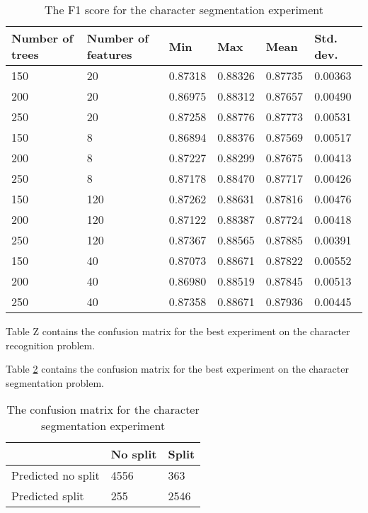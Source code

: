 \begin{table}[h]
\caption{The F1 score for the character segmentation experiment}
\label{table:seg_values}
\begin{tabular}{llllll}
\hline
Number of trees & Number of features & Min     & Max     & Mean    & Std. dev. \\ \hline
150 & 20 & 0.87318 & 0.88326 & 0.87735 & 0.00363 \\ 
200 & 20 & 0.86975 & 0.88312 & 0.87657 & 0.00490 \\ 
250 & 20 & 0.87258 & 0.88776 & 0.87773 & 0.00531 \\ 
150 & 8 & 0.86894 & 0.88376 & 0.87569 & 0.00517 \\ 
200 & 8 & 0.87227 & 0.88299 & 0.87675 & 0.00413 \\ 
250 & 8 & 0.87178 & 0.88470 & 0.87717 & 0.00426 \\ 
150 & 120 & 0.87262 & 0.88631 & 0.87816 & 0.00476 \\ 
200 & 120 & 0.87122 & 0.88387 & 0.87724 & 0.00418 \\ 
250 & 120 & 0.87367 & 0.88565 & 0.87885 & 0.00391 \\ 
150 & 40 & 0.87073 & 0.88671 & 0.87822 & 0.00552 \\ 
200 & 40 & 0.86980 & 0.88519 & 0.87845 & 0.00513 \\ 
250 & 40 & 0.87358 & 0.88671 & 0.87936 & 0.00445 \\  \hline
\end{tabular}
\end{table}

Table Z contains the confusion matrix for the best experiment on the character recognition problem.

Table \ref{table:seg_conf} contains the confusion matrix for the best experiment on the character segmentation problem.

\begin{table}[h]
\caption{The confusion matrix for the character segmentation experiment}
\label{table:seg_conf}
\begin{tabular}{lll}
\hline
 & No split & Split \\ \hline
Predicted no split & 4556 & 363 \\ 
Predicted split & 255 & 2546 \\  \hline
\end{tabular}
\end{table}
